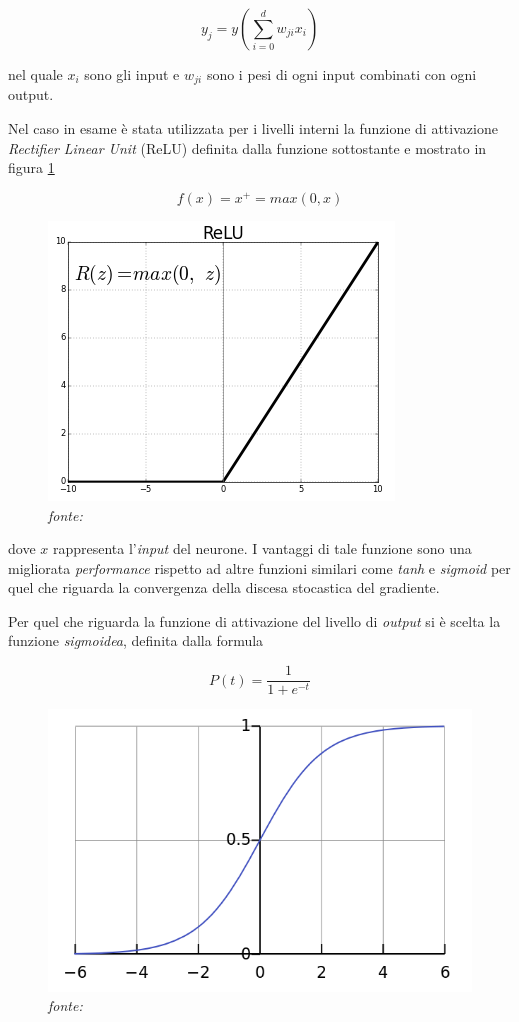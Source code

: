 \[y_j=y\left( \sum_{i=0}^d w_{ji}x_i \right)\]


nel quale $x_i$ sono gli input e $w_{ji}$ sono i pesi di ogni input combinati con ogni output. 

Nel caso in esame è stata utilizzata per i livelli interni la funzione di attivazione \textit{Rectifier Linear Unit} (ReLU) \cite{relu} definita dalla funzione sottostante e mostrato in figura \ref{fig:relu}

\[f(x) = x^+ = max(0,x)\]

\begin{figure}[htb]
    \centering
    \includegraphics[width=0.5\columnwidth]{figures/relu.png}
    \caption{\textit{fonte:} \cite{relufig}}
\label{fig:relu}
\end{figure}

dove $x$ rappresenta l'\textit{input} del neurone. 
I vantaggi di tale funzione sono una migliorata \textit{performance} rispetto ad altre funzioni similari come \textit{tanh} e \textit{sigmoid} per quel che riguarda la convergenza della discesa stocastica del gradiente. 

Per quel che riguarda la funzione di attivazione del livello di \textit{output} si è scelta la funzione \textit{sigmoidea}, definita dalla formula 

\[P(t) = \frac{1}{1+e^{-t}}\]

\begin{figure}[htb]
    \centering
    \includegraphics[width=0.5\columnwidth]{figures/sigmoid.png}
    \caption{\textit{fonte:} \cite{fig:sigmoid}}
\label{fig:sigmoid}
\end{figure}


